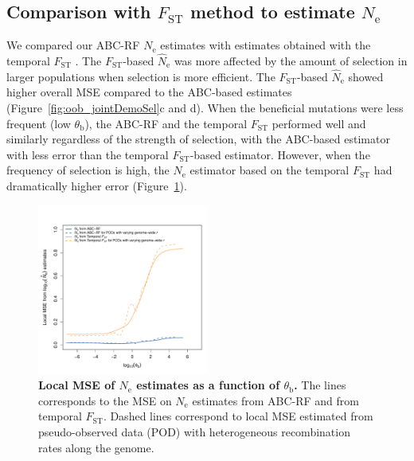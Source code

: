 \documentclass[a4paper, 12pt]{article}
\begin{document}
\subsection*{Comparison with $F_{\mathrm{ST}}$ method to estimate $N_\mathrm{e}$}

We compared our ABC-RF $N_\mathrm{e}$ estimates with estimates obtained with the temporal $F_\mathrm{ST}$ \citep{Frachon:2017fw}. The $F_{\mathrm{ST}}$-based $\hat N_\mathrm{e}$ was more affected by the amount of selection in larger populations when selection is more efficient. The $F_{\mathrm{ST}}$-based $\hat N_\mathrm{e}$ showed higher overall MSE compared to the ABC-based estimates (Figure~\ref{fig:oob_jointDemoSel}c and d). When the beneficial mutations were less frequent (low $\theta_{\mathrm{b}}$), the ABC-RF and the temporal $F_{\mathrm{ST}}$ performed well and similarly regardless of the strength of selection, with the ABC-based estimator with less error than the temporal $F_{\mathrm{ST}}$-based estimator. However, when the frequency of selection is high, the $N_{\mathrm{e}}$ estimator based on the temporal $F_{\mathrm{ST}}$ had dramatically higher error (Figure~\ref{fig:local_mse_nes}).

\begin{figure}[ht]
  \centering
  \includegraphics[width=0.50\textwidth]{Figures/Figure3_abcrfNE_fstNE_local_mse_recomb.pdf}
  \small\caption{\textbf{Local MSE of $N_{\mathrm{e}}$ estimates as a function of $\theta_{\mathrm{b}}$.} The lines corresponds to the MSE on $N_{\mathrm{e}}$ estimates from ABC-RF and from temporal $F_{\mathrm{ST}}$. Dashed lines correspond to local MSE estimated from pseudo-observed data (POD) with heterogeneous recombination rates along the genome.}
  \label{fig:local_mse_nes}
\end{figure}
\end{document}
